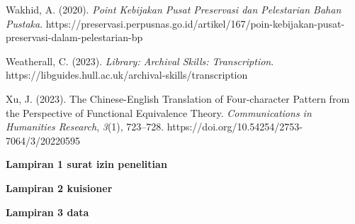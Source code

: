 \documentclass[
]{article}
\begin{document}
Wakhid, A. (2020). \emph{Point Kebijakan Pusat Preservasi dan
Pelestarian Bahan Pustaka}.
https://preservasi.perpusnas.go.id/artikel/167/poin-kebijakan-pusat-preservasi-dalam-pelestarian-bp

Weatherall, C. (2023). \emph{Library: Archival Skills: Transcription}.
https://libguides.hull.ac.uk/archival-skills/transcription

Xu, J. (2023). The Chinese-English Translation of Four-character Pattern
from the Perspective of Functional Equivalence Theory.
\emph{Communications in Humanities Research}, \emph{3}(1), 723--728.
https://doi.org/10.54254/2753-7064/3/20220595

\protect\hypertarget{_4moq2jbvxxm5}{}{}\textbf{Lampiran 1 surat izin
penelitian}

\protect\hypertarget{_raokolpcgoou}{}{}\textbf{Lampiran 2 kuisioner}

\protect\hypertarget{_uh6gz9aal5m}{}{}\textbf{Lampiran 3 data}
\end{document}
